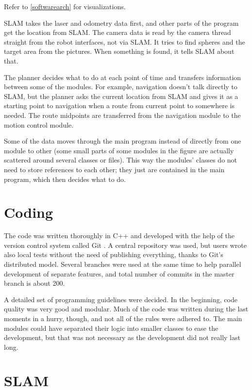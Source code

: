 \documentclass[a4paper,10pt]{article}
\begin{document}
Refer to \ref{softwarearch} for visualizations.

SLAM takes the laser and odometry data first, and other parts of the program get the location from SLAM. The camera data is read by the camera thread straight from the robot interfaces, not via SLAM. It tries to find spheres and the target area from the pictures. When something is found, it tells SLAM about that.

The planner decides what to do at each point of time and transfers information between some of the modules. For example, navigation doesn’t talk directly to SLAM, but the planner asks the current location from SLAM and gives it as a starting point to navigation when a route from current point to somewhere is needed. The route midpoints are transferred from the navigation module to the motion control module.

Some of the data moves through the main program instead of directly from one module to other (some small parts of some modules in the figure are actually scattered around several classes or files). This way the modules' classes do not need to store references to each other; they just are contained in the main program, which then decides what to do.

\section{Coding}

The code was written thoroughly in C++ and developed with the help of the version control system called Git \cite{git}. A central repository was used, but users wrote also local tests without the need of publishing everything, thanks to Git's distributed model. Several branches were used at the same time to help parallel development of separate features, and total number of commits in the master branch is about 200.

A detailed set of programming guidelines were decided. In the beginning, code quality was very good and modular. Much of the code was written during the last moments in a hurry, though, and not all of the rules were adhered to. The main modules could have separated their logic into smaller classes to ease the development, but that was not necessary as the development did not really last long.

\section{SLAM}
\end{document}
